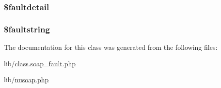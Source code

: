 \subsubsection[{\$faultdetail}]{\setlength{\rightskip}{0pt plus 5cm}\$faultdetail}\label{classnusoap__fault_a7683364ae0ad0e22863a0f20f0626453}
\hypertarget{classnusoap__fault_acc1a7d86f9bd39e5717add56fbcdfaaa}{}
\subsubsection[{\$faultstring}]{\setlength{\rightskip}{0pt plus 5cm}\$faultstring}\label{classnusoap__fault_acc1a7d86f9bd39e5717add56fbcdfaaa}


The documentation for this class was generated from the following files\+:\begin{DoxyCompactItemize}
\item 
lib/\hyperlink{class_8soap__fault_8php}{class.\+soap\+\_\+fault.\+php}\item 
lib/\hyperlink{nusoap_8php}{nusoap.\+php}\end{DoxyCompactItemize}
